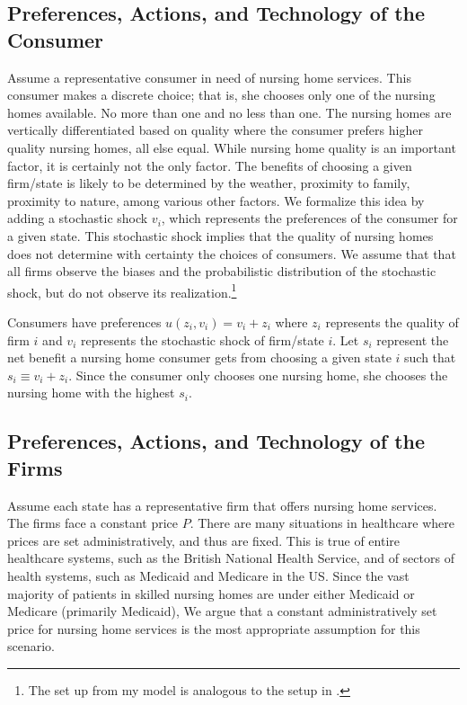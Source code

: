 \documentclass[../Main.tex]{subfiles}
\begin{document}
\subsection{Preferences, Actions, and Technology of the Consumer}
Assume a representative consumer in need of nursing home services. This consumer makes a discrete choice; that is, she chooses only one of the nursing homes available. No more than one and no less than one. The nursing homes are vertically differentiated based on quality where the consumer prefers higher quality nursing homes, all else equal. While nursing home quality is an important factor, it is certainly not the only factor. The benefits of choosing a given firm/state is likely to be determined by the weather, proximity to family, proximity to nature, among various other factors. We formalize this idea by adding a stochastic shock $v_i$, which represents the preferences of the consumer for a given state. This stochastic shock implies that the quality of nursing homes does not determine with certainty the choices of consumers. We assume that that all firms observe the biases and the probabilistic distribution of the stochastic shock, but do not observe its realization.\footnote{The set up from my model is analogous to the setup in \citet{basinger2004remodeling}.} 

Consumers have preferences $u(z_i,v_i) = v_i + z_i$ where $z_i$ represents the quality of firm $i$ and $v_i$ represents the stochastic shock of firm/state $i$. Let $s_i$ represent the net benefit a nursing home consumer gets from choosing a given state $i$ such that $s_i \equiv v_i + z_i$. Since the consumer only chooses one nursing home, she chooses the nursing home with the highest $s_i$.

\subsection{Preferences, Actions, and Technology of the Firms}
Assume each state has a representative firm that offers nursing home services. The firms face a constant price $P$. There are many situations in healthcare where prices are set administratively, and thus are fixed. This is true of entire healthcare systems, such as the British National Health Service, and of sectors of health systems, such as Medicaid and Medicare in the US. Since the vast majority of patients in skilled nursing homes are under either Medicaid or Medicare (primarily Medicaid), We argue that a constant administratively set price for nursing home services is the most appropriate assumption for this scenario.
\end{document}
